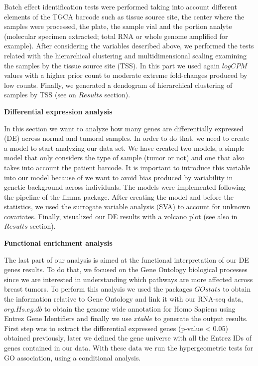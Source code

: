 \documentclass[9pt,twocolumn,twoside]{gsajnl}
\begin{document}
Batch effect identification tests were performed taking into account different elements of the TGCA barcode such as tissue source site, the center where the samples were processed, the plate, the sample vial and the portion analyte (molecular specimen extracted; total RNA or whole genome amplified for example). After considering the variables described above, we performed the tests related with the hierarchical clustering and multidimensional scaling examining the samples by the tissue source site (TSS). In this part we used again $log CPM$ values with a higher prior count to moderate extreme fold-changes produced by low counts. Finally, we generated a dendogram of hierarchical clustering of samples by TSS (see on $Results$ section). 
\vspace{4mm}

\textbf{Differential expression analysis}
\vspace{2mm}

In this section we want to analyze how many genes are differentially expressed (DE) across normal and tumoral samples. In order to do that, we need to create a model to start analyzing our data set. We have created two models, a simple model that only considers the type of sample (tumor or not) and one that also takes into account the patient barcode. It is important to introduce this variable into our model because of we want to avoid bias produced by variability in genetic background across individuals. The models were implemented following the pipeline of the limma package. After creating the model and before the statistics, we used the surrogate variable analysis (SVA) to account for unknown covariates. Finally, visualized our DE results with a volcano plot (see also in $Results$ section).
\vspace{4mm}

\textbf{Functional enrichment analysis}
\vspace{2mm}

The last part of our analysis is aimed at the functional interpretation of our DE genes results. To do that, we focused on the Gene Ontology biological processes since we are interested in understanding which pathways are more affected across breast tumors. To perform this analysis we used the packages $GOstats$ to obtain the information relative to Gene Ontology and link it with our RNA-seq data, $org.Hs.eg.db$ to obtain the genome wide annotation for Homo Sapiens using Entrez Gene Identifiers and finally we use $xtable$ to generate the output results. First step was to extract the differential expressed genes (p-value < 0.05) obtained previously, later we defined the gene universe with all the Entrez IDs of genes contained in our data. With these data we run the hypergeometric tests for GO association, using a conditional analysis.
\vspace{2mm}
\end{document}
